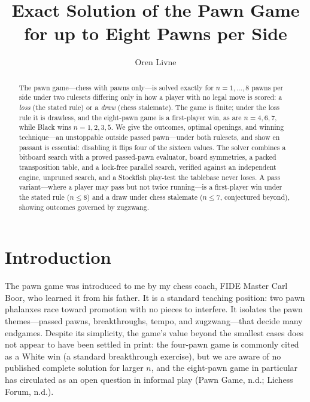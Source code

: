 \documentclass[Afour,sageapa,times]{sagej}
\theoremstyle{plain}
\theoremstyle{definition}
\begin{document}

\title{Exact Solution of the Pawn Game for up to Eight Pawns per Side}

\author{Oren Livne}

\begin{abstract}
The pawn game---chess with pawns only---is solved exactly for $n=1,\dots,8$
pawns per side under two rulesets differing only in how a player with no legal
move is scored: a \emph{loss} (the stated rule) or a \emph{draw} (chess
stalemate). The game is finite; under the loss rule it is drawless, and the
eight-pawn game is a first-player win, as are $n=4,6,7$, while Black wins
$n=1,2,3,5$. We give the outcomes, optimal openings, and winning
technique---an unstoppable outside passed pawn---under both rulesets, and
show en passant is essential: disabling it flips four of the sixteen values.
The solver combines a bitboard search with a proved passed-pawn evaluator,
board symmetries, a packed transposition table, and a lock-free parallel
search, verified against an independent engine, unpruned search, and a
Stockfish play-test the tablebase never loses. A pass variant---where a
player may pass but not twice running---is a first-player win under the
stated rule ($n\le 8$) and a draw under chess stalemate ($n\le 7$,
conjectured beyond), showing outcomes governed by zugzwang.
\end{abstract}


\maketitle

\section{Introduction}
The pawn game was introduced to me by my chess coach, FIDE Master Carl Boor, who learned it from his father. It is a standard teaching position: two pawn phalanxes race toward promotion with no pieces to interfere. It isolates the pawn themes---passed
pawns, breakthroughs, tempo, and zugzwang---that decide many endgames.
Despite its simplicity, the game's value beyond the smallest cases does not appear
to have been settled in print: the four-pawn game is commonly cited as a White win
(a standard breakthrough exercise), but we are aware of no published complete
solution for larger $n$, and the eight-pawn game in particular has circulated as an
open question in informal play (Pawn Game, n.d.; Lichess Forum, n.d.).
\end{document}
